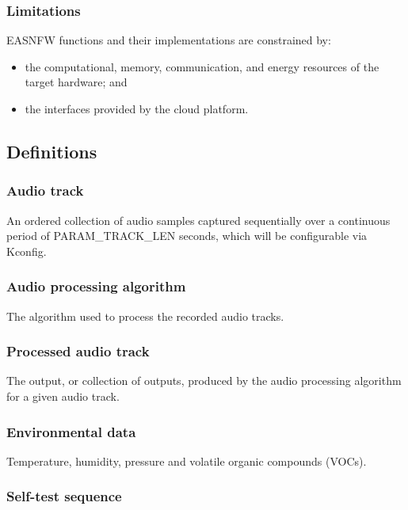 \documentclass[11pt,a4paper]{article}
\begin{document}
\subsubsection{Limitations}

EASNFW functions and their implementations are constrained by:

\begin{itemize}
    \item the computational, memory, communication, and energy resources of the
          target hardware; and
    \item the interfaces provided by the cloud platform.
\end{itemize}

\subsection{Definitions}

\subsubsection{Audio track}

An ordered collection of audio samples captured sequentially over a continuous
period of PARAM\_TRACK\_LEN seconds, which will be configurable via Kconfig.

\subsubsection{Audio processing algorithm}

The algorithm used to process the recorded audio tracks.

\subsubsection{Processed audio track}

The output, or collection of outputs, produced by the audio processing
algorithm for a given audio track.

\subsubsection{Environmental data}

Temperature, humidity, pressure and volatile organic compounds (VOCs).

\subsubsection{Self-test sequence}
\end{document}
